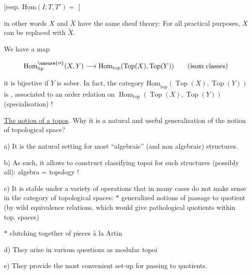
[resp. $\underline{\mathrm{Hom}}(I;T,T')=$ \hspace{2em}]

in other words $X$ and $\bar X$ have the same sheaf theory:
For all  practical purposes, $X$ can be replaced with $\widetilde X$.

 We have a map

\[
\operatorname{Hom}_{\mathrm{Sp}}^{\unsure{\prime\prime}}(X,Y)\longrightarrow
\operatorname{Hom}_{\mathrm{top}}(\operatorname{Top}(X),\operatorname{Top}(Y))
\qquad(\text{isom classes})
\]

it is bijective if $Y$ is sober. In fact, the category $\underline{\mathrm{Hom}}_{\mathrm{top}}(\operatorname{Top}(X),\operatorname{Top}(Y))$
is , associated to an order relation on $\operatorname{Hom}_{\mathrm{top}}(\operatorname{Top}(X),\operatorname{Top}(Y))$
(specialisation) !

\uline{The notion of a topos}. 
Why it is a natural and useful generalisation of the notion of topological space?

a) It is the natural setting for most ``algebraic'' (and non algebraic) structures.

b) As such, it allows to construct classifying topoi for such structures (possibly all): algebra = topology !

c) It is stable under a variety of operations that in many cases do not make sense in the category of topological spaces:
$*$ generalized notions of passage to quotient (by wild equivalence relations, which would give pathological quotients within top. spaces)

$*$ clutching together of pieces à la Artin

d) They arise in various questions  as modular topoi

e) They provide the most convenient set-up for
  passing to quotients.

